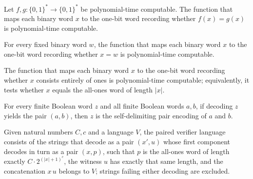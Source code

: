 \begin{lemma}
\label{Complexity.a3n_poly_eq}
\leanok
{}
Let $f,g : \{0,1\}^* \to \{0,1\}^*$ be polynomial-time computable. The function that
maps each binary word $x$ to the one-bit word recording whether $f(x)=g(x)$ is
polynomial-time computable.
\end{lemma}

\begin{lemma}
\label{Complexity.a3n_poly_fixed_eq}
\leanok
{}
For every fixed binary word $w$, the function that maps each binary word $x$ to the
one-bit word recording whether $x=w$ is polynomial-time computable.
\end{lemma}

\begin{lemma}
\label{Complexity.a3n_poly_unary}
\leanok
{}
The function that maps each binary word $x$ to the one-bit word recording whether $x$
consists entirely of ones is polynomial-time computable; equivalently, it tests whether
$x$ equals the all-ones word of length $|x|$.
\end{lemma}

\begin{lemma}
\label{Complexity.a3n_pair_inverse}
\leanok
{}
For every finite Boolean word $z$ and all finite Boolean words $a,b$, if decoding $z$
yields the pair $(a,b)$, then $z$ is the self-delimiting pair encoding of $a$ and $b$.
\end{lemma}

\begin{definition}
\label{Complexity.a3nVerifier}
\leanok
{}
Given natural numbers $C, c$ and a language $V$, the paired verifier language consists of the strings that decode as a pair $(x', u)$ whose first component decodes in turn as a pair $(x, p)$, such that $p$ is the all-ones word of length exactly $C\cdot 2^{(|x|+1)^c}$, the witness $u$ has exactly that same length, and the concatenation $x\,u$ belongs to $V$; strings failing either decoding are excluded.
\end{definition}

